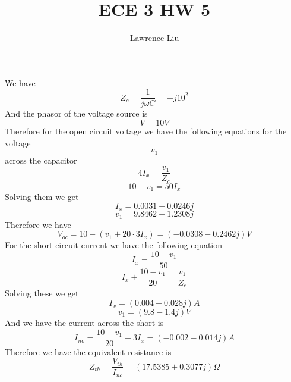 \documentclass[12pt]{article}
\title{ECE 3 HW 5}
\author{Lawrence Liu}
\begin{document}
\maketitle
We have
$$Z_c=\frac{1}{j\omega C}=-j10^2$$
And the phasor of the voltage source is
$$V=10V$$
Therefore for the open circuit voltage we have the following equations for the voltage
$$v_1$$ across the capacitor
$$4I_x=\frac{v_1}{Z_c}$$
$$10-v_1=50I_x$$
Solving them we get
$$I_x=0.0031+0.0246j$$
$$v_1=9.8462-1.2308j$$
Therefore we have
$$V_{oc}=10-(v_1+20\cdot3I_x)=\boxed{(-0.0308-0.2462j) V}$$
For the short circuit current we have the following equation
$$I_x=\frac{10-v_1}{50}$$
$$I_x+\frac{10-v_1}{20}=\frac{v_1}{Z_c}$$
Solving these we get
$$I_x=(0.004+0.028j)A$$
$$v_1=(9.8-1.4j)V$$
And we have the current across the short is
$$I_{no}=\frac{10-v_1}{20}-3I_x=(-0.002-0.014j)A$$
Therefore we have the equivalent resistance is
$$Z_{th}=\frac{V_{th}}{I_{no}}=\boxed{(17.5385+0.3077j)\Omega}$$
\end{document}
